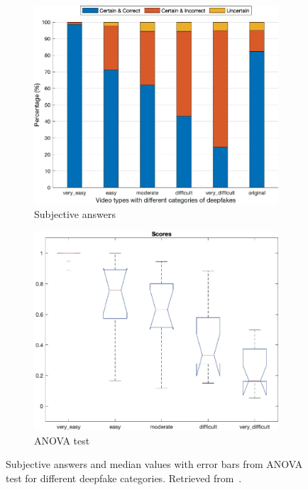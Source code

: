 \begin{figure}[H]
    \begin{subfigure}[h]{0.4985\linewidth}
        \centering
        \includegraphics[width=1\linewidth]{other-fig/subjective_answers_a.png}
        \caption{Subjective answers}
    \end{subfigure}
    \hfill
    \begin{subfigure}[h]{0.4985\linewidth}
        \centering
        \includegraphics[width=1\linewidth]{other-fig/subjective_answers_b.png}
        \caption{ANOVA test}
    \end{subfigure}
    \caption{Subjective answers and median values with error bars from ANOVA test for different deepfake categories. Retrieved from~\cite{TheThreatOfDeepfakes}.}
    \label{fig:subjective_answers}
\end{figure}

